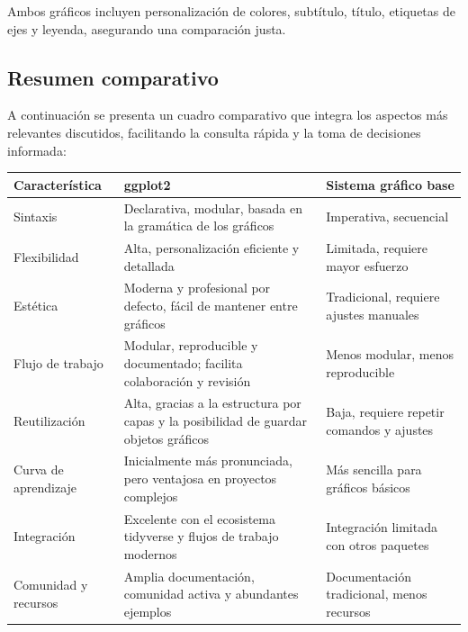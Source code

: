 \documentclass[
  spanish,
  a4paper,
  DIV=11,
  numbers=noendperiod,
  onepage,
  openany]{scrreprt}
\begin{document}
Ambos gráficos incluyen personalización de colores, subtítulo, título,
etiquetas de ejes y leyenda, asegurando una comparación justa.

\subsection{Resumen comparativo}\label{resumen-comparativo}

A continuación se presenta un cuadro comparativo que integra los
aspectos más relevantes discutidos, facilitando la consulta rápida y la
toma de decisiones informada:

\begin{longtable}[]{@{}
  >{\raggedright\arraybackslash}p{}
  >{\raggedright\arraybackslash}p{}
  >{\raggedright\arraybackslash}p{}@{}}
\toprule\noalign{}
\begin{minipage}[b]{\linewidth}\raggedright
Característica
\end{minipage} & \begin{minipage}[b]{\linewidth}\raggedright
ggplot2
\end{minipage} & \begin{minipage}[b]{\linewidth}\raggedright
Sistema gráfico base
\end{minipage} \\
\midrule\noalign{}
\endhead
\bottomrule\noalign{}
\endlastfoot
Sintaxis & Declarativa, modular, basada en la gramática de los gráficos
& Imperativa, secuencial \\
Flexibilidad & Alta, personalización eficiente y detallada & Limitada,
requiere mayor esfuerzo \\
Estética & Moderna y profesional por defecto, fácil de mantener entre
gráficos & Tradicional, requiere ajustes manuales \\
Flujo de trabajo & Modular, reproducible y documentado; facilita
colaboración y revisión & Menos modular, menos reproducible \\
Reutilización & Alta, gracias a la estructura por capas y la posibilidad
de guardar objetos gráficos & Baja, requiere repetir comandos y
ajustes \\
Curva de aprendizaje & Inicialmente más pronunciada, pero ventajosa en
proyectos complejos & Más sencilla para gráficos básicos \\
Integración & Excelente con el ecosistema tidyverse y flujos de trabajo
modernos & Integración limitada con otros paquetes \\
Comunidad y recursos & Amplia documentación, comunidad activa y
abundantes ejemplos & Documentación tradicional, menos recursos \\
\end{longtable}
\end{document}
